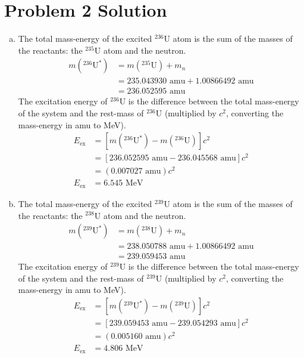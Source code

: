 \documentclass{report}
\begin{document}
\newpage


\section*{Problem 2 Solution}

\begin{enumerate}[a)]

\item 

The total mass-energy of the excited $^{236}$U atom is the sum of the masses of the reactants: the $^{235}$U atom and the neutron.
\begin{align*}
m(^{236}\text{U}^*)	&= m(^{235}\text{U}) + m_n \\
					&= 235.043930\text{ amu} + 1.00866492\text{ amu} \\
					&= 236.052595\text{ amu}
\end{align*}
The excitation energy of $^{236}$U is the difference between the total mass-energy of the system and the rest-mass of $^{236}$U (multiplied by $c^2$, converting the mass-energy in amu to MeV).
\begin{align*}
E_{\text{ex}}	&= \left[m(^{236}\text{U}^*) - m(^{236}\text{U})\right]c^2 \\
				&= \left[236.052595\text{ amu} - 236.045568\text{ amu}\right]c^2 \\
				&= (0.007027\text{ amu})c^2 \\
E_{\text{ex}}	&= 6.545\text{ MeV} 
\end{align*}


\item

The total mass-energy of the excited $^{239}$U atom is the sum of the masses of the reactants: the $^{238}$U atom and the neutron.
\begin{align*}
m(^{239}\text{U}^*)	&= m(^{238}\text{U}) + m_n \\
					&= 238.050788\text{ amu} + 1.00866492\text{ amu} \\
					&= 239.059453\text{ amu}
\end{align*}
The excitation energy of $^{239}$U is the difference between the total mass-energy of the system and the rest-mass of $^{239}$U (multiplied by $c^2$, converting the mass-energy in amu to MeV).
\begin{align*}
E_{\text{ex}}	&= \left[m(^{239}\text{U}^*) - m(^{239}\text{U})\right]c^2 \\
				&= \left[239.059453\text{ amu} - 239.054293\text{ amu}\right]c^2 \\
				&= (0.005160\text{ amu})c^2 \\
E_{\text{ex}}	&= 4.806\text{ MeV} 
\end{align*}



\end{enumerate}
\end{document}
